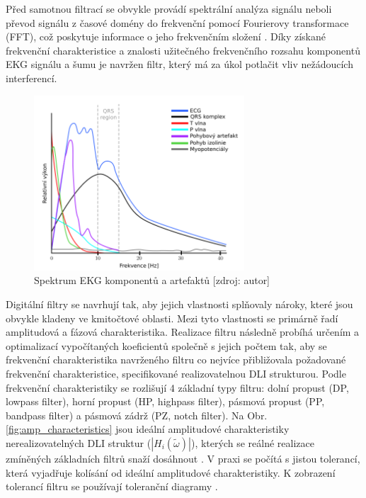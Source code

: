 Před samotnou filtrací se obvykle provádí spektrální analýza signálu neboli
převod signálu z časové domény do frekvenční pomocí Fourierovy transformace
(FFT), což poskytuje informace o jeho frekvenčním složení \cite{Prchal2000}.
Díky získané frekvenční charakteristice a znalosti užitečného frekvenčního
rozsahu komponentů EKG signálu a šumu je navržen filtr, který má za úkol
potlačit vliv nežádoucích interferencí.

\begin{figure}[h]
	\begin{center}
		\includegraphics[width=0.7\textwidth]{../assets/figures/ecg_spectrum}
		\caption{Spektrum EKG komponentů a artefaktů [zdroj: autor]}
		\label{fig:ecg_spectrum}
	\end{center}
\end{figure}

Digitální filtry se navrhují tak, aby jejich vlastnosti splňovaly nároky, které
jsou obvykle kladeny ve kmitočtové oblasti. Mezi tyto vlastnosti se primárně
řadí amplitudová a fázová charakteristika. Realizace filtru následně probíhá
určením a optimalizací vypočítaných koeficientů společně s jejich počtem tak,
aby se frekvenční charakteristika navrženého filtru co nejvíce přibližovala
požadované frekvenční charakteristice, specifikované realizovatelnou DLI
strukturou. Podle frekvenční charakteristiky se rozlišují 4 základní typy
filtru: dolní propust (DP, lowpass filter), horní propust (HP, highpass filter),
pásmová propust (PP, bandpass filter) a pásmová zádrž (PZ, notch filter). Na
Obr. \ref{fig:amp_characteristics} jsou ideální amplitudové charakteristiky
nerealizovatelných DLI struktur ($|H_i(\widetilde\omega)|$), kterých se reálné
realizace zmíněných základních filtrů snaží dosáhnout
\cite{Skop1994,Prchal2000}. V praxi se počítá s jistou tolerancí, která
vyjadřuje kolísání od ideální amplitudové charakteristiky. K zobrazení tolerancí
filtru se používají toleranční diagramy \cite{Prchal2000,Lyons1997}.

